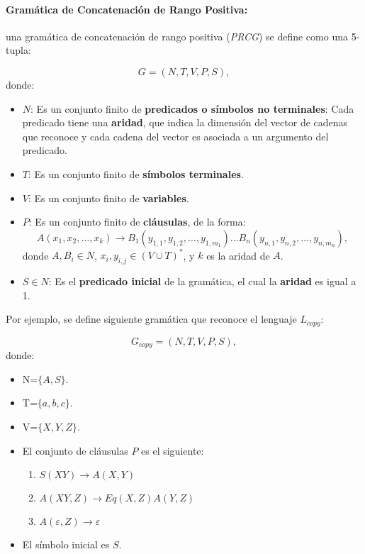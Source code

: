 \documentclass[12pt]{article}
\begin{document}
\paragraph{Gramática de Concatenación de Rango Positiva:} una gramática de concatenación de rango positiva (\textit{PRCG}) se define como una 5-tupla:

\[
    G = (N, T, V, P, S),
\]
donde:

\begin{itemize}
    \item $N$: Es un conjunto finito de \textbf{predicados o símbolos no terminales}: Cada predicado tiene una \textbf{aridad}, que indica la dimensión del vector de cadenas que reconoce y cada cadena del vector es asociada a un argumento del predicado.
    \item $T$: Es un conjunto finito de \textbf{símbolos terminales}.
    \item $V$: Es un conjunto finito de \textbf{variables}.
    \item $P$: Es un conjunto finito de \textbf{cláusulas}, de la forma:
          \[
              A(x_1, x_2, \ldots, x_k) \to B_1(y_{1,1}, y_{1,2}, \ldots, y_{1,m_1}) \ldots B_n(y_{n,1}, y_{n,2}, \ldots, y_{n,m_n}),
          \]
          donde $A, B_i \in N$, $x_i, y_{i,j} \in (V \cup T)^*$, y $k$ es la aridad de $A$.
    \item $S \in N$: Es el \textbf{predicado inicial} de la gramática, el cual la \textbf{aridad} es igual a 1.
\end{itemize}

Por ejemplo, se define siguiente gramática que reconoce el lenguaje $L_{copy}$:

\[
    G_{copy} = (N, T, V, P, S),
\]
donde:

\begin{itemize}
    \item  N=$\{A,S\}$.
    \item T=$\{a,b,c\}$.
    \item V=$\{X,Y,Z\}$.
    \item El conjunto de cláusulas $P$ es el siguiente:
          \begin{enumerate}
              \item $S(XY)\to A(X,Y)$
              \item $A(XY,Z)\to Eq(X,Z)A(Y,Z)$
              \item $A(\varepsilon,Z)\to \varepsilon$
          \end{enumerate}
    \item El símbolo inicial es $S$.
\end{itemize}
\end{document}
